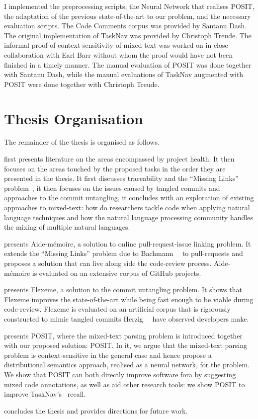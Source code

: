 \begin{itemize}[leftmargin=*]
    \noindent I implemented the preprocessing scripts, the Neural Network
    that realises POSIT, the adaptation of the previous state-of-the-art to our
    problem, and the necessary evaluation scripts. The Code Comments corpus was
    provided by Santanu Dash. The original implementation of TaskNav was
    provided by Christoph Treude. The informal proof of context-sensitivity of
    mixed-text was worked on in close collaboration with Earl Barr without whom
    the proof would have not been finished in a timely manner. The manual
    evaluation of POSIT was done together with Santanu Dash, while the manual
    evaluations of TaskNav augmented with POSIT were done together with
    Christoph Treude.
\end{itemize}

\section{Thesis Organisation}
\label{chapter:introduction:sec:organisation}

The remainder of the thesis is organised as follows.

 first presents literature on the areas encompassed by
project health. It then focuses on the areas touched by the proposed tasks in
the order they are presented in the thesis. It first discusses traceability and
the ``Missing Links'' problem~\cite{MissingLinks}, it then focuses on the issues
caused by tangled commits and approaches to the commit untangling, it concludes
with an exploration of existing approaches to mixed-text: how do researchers
tackle code when applying natural language techniques and how the natural
language processing community handles the mixing of multiple natural languages.

 presents Aide-mémoire, a solution to online pull-request-issue
linking problem. It extends the ``Missing Links'' problem due to
Bachmann~\etal~\cite{MissingLinks} to pull-requests and proposes a solution that
can live along side the code-review process. Aide-mémoire is evaluated on an
extensive corpus of GitHub projects.

 presents Flexeme, a solution to the commit untangling
problem. It shows that Flexeme improves the state-of-the-art while being fast
enough to be viable during code-review. Flexeme is evaluated on an artificial
corpus that is rigorously constructed to mimic tangled commits
Herzig~\etal~\cite{Herzig2016} have observed developers make.

 presents POSIT, where the mixed-text parsing problem is
introduced together with our proposed solution: POSIT. In it, we argue that the
mixed-text parsing problem is context-sensitive in the general case and hence
propose a distributional semantics approach, realised as a neural network, for
the problem. We show that POSIT can both directly improve software fora by
suggesting mixed code annotations, as well as aid other research tools: we show
POSIT to improve TaskNav's~\cite{Treude:2015:TTN:2819009.2819128} recall.

 concludes the thesis and provides directions for
future work.